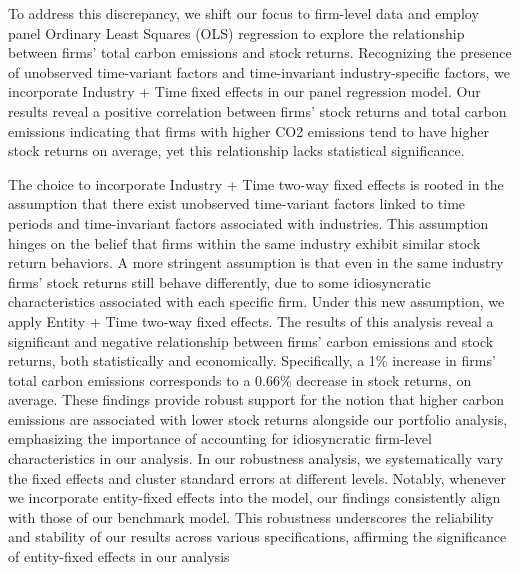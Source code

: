 \documentclass[12pt]{article}
\begin{document}
To address this discrepancy, we shift our focus to firm-level data and employ panel Ordinary Least Squares (OLS) regression to explore the relationship between firms' total carbon emissions and stock returns. Recognizing the presence of unobserved time-variant factors and time-invariant industry-specific factors, we incorporate Industry + Time fixed effects in our panel regression model. Our results reveal a positive correlation between firms' stock returns and total carbon emissions indicating that firms with higher CO2 emissions tend to have higher stock returns on average, yet this relationship lacks statistical significance. 

The choice to incorporate Industry + Time two-way fixed effects is rooted in the assumption that there exist unobserved time-variant factors linked to time periods and time-invariant factors associated with industries. This assumption hinges on the belief that firms within the same industry exhibit similar stock return behaviors. A more stringent assumption is that even in the same industry firms' stock returns still behave differently, due to some idiosyncratic characteristics associated with each specific firm. Under this new assumption, we apply Entity + Time two-way fixed effects. The results of this analysis reveal a significant and negative relationship between firms' carbon emissions and stock returns, both statistically and economically. Specifically, a 1\% increase in firms' total carbon emissions corresponds to a 0.66\% decrease in stock returns, on average. These findings provide robust support for the notion that higher carbon emissions are associated with lower stock returns alongside our portfolio analysis, emphasizing the importance of accounting for idiosyncratic firm-level characteristics in our analysis. In our robustness analysis, we systematically vary the fixed effects and cluster standard errors at different levels. Notably, whenever we incorporate entity-fixed effects into the model, our findings consistently align with those of our benchmark model. This robustness underscores the reliability and stability of our results across various specifications, affirming the significance of entity-fixed effects in our analysis
\end{document}
